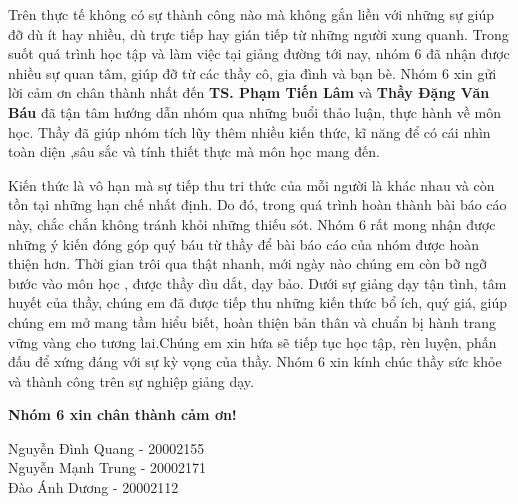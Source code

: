 \documentclass[
12pt,
oneside,
english,
doublespacing,
nolistspacing,
liststotoc,
parskip,
headsepline,
chapterinoneline,
]{HUSdissertation}
\author{Nhóm 6}
\begin{document}
\lstset{style=codeC}	%

\frontmatter 			%

\pagestyle{plain} 


%






\begin{acknowledgements}
	\addchaptertocentry{\acknowledgementname}
	\thispagestyle{empty}
	
	Trên thực tế không có sự thành công nào mà không gắn liền với những sự giúp đỡ dù ít hay nhiều, dù trực tiếp hay gián tiếp từ những người xung quanh. Trong suốt quá trình học tập và làm việc tại giảng đường tới nay, nhóm 6 đã nhận được nhiều sự quan tâm, giúp đỡ từ các thầy cô, gia đình và bạn bè. Nhóm 6 xin gửi lời cảm ơn chân thành nhất đến \textbf{TS. Phạm Tiến Lâm} và \textbf{Thầy Đặng Văn Báu} đã tận tâm hướng dẫn nhóm qua những buổi thảo luận, thực hành về môn học. Thầy đã giúp nhóm tích lũy thêm nhiều kiến thức, kĩ năng để có cái nhìn toàn diện ,sâu sắc và tính thiết thực mà môn học mang đến.
	
	Kiến thức là vô hạn mà sự tiếp thu tri thức của mỗi người là khác nhau và còn tồn tại những hạn chế nhất định. Do đó, trong quá trình hoàn thành bài báo cáo này, chắc chắn không tránh khỏi những thiếu sót. Nhóm 6 rất mong nhận được những ý kiến đóng góp quý báu từ thầy để bài báo cáo của nhóm được hoàn thiện hơn.
      Thời gian trôi qua thật nhanh, mới ngày nào chúng em còn bỡ ngỡ bước vào môn học , được thầy dìu dắt, dạy bảo. Dưới sự giảng dạy tận tình, tâm huyết của thầy, chúng em đã được tiếp thu những kiến thức bổ ích, quý giá, giúp chúng em mở mang tầm hiểu biết, hoàn thiện bản thân và chuẩn bị hành trang vững vàng cho tương lai.Chúng em xin hứa sẽ tiếp tục học tập, rèn luyện, phấn đấu để xứng đáng với sự kỳ vọng của thầy.
	Nhóm 6 xin kính chúc thầy sức khỏe và thành công trên sự nghiệp giảng dạy.
	
	\textbf{Nhóm 6 xin chân thành cảm ơn!}
	
	\begin{flushright}
		
		Nguyễn Đình Quang - 20002155\\
		Nguyễn Mạnh Trung - 20002171\\
		Đào Ánh Dương - 20002112\\
		
	\end{flushright}
\end{acknowledgements}
\end{document}

